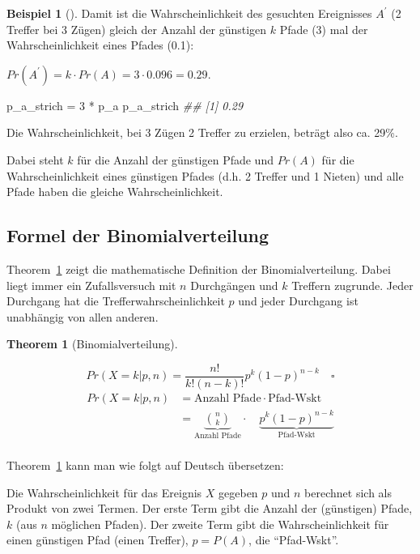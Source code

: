 \documentclass[
  ngerman,
  letterpaper,
  twoside,
  open=any]{scrbook}
\newenvironment{Shaded}{\begin{snugshade}}{\end{snugshade}}
\newcommand{\DecValTok}[1]{\textcolor[rgb]{0.68,0.00,0.00}{#1}}
\newcommand{\DocumentationTok}[1]{\textcolor[rgb]{0.37,0.37,0.37}{\textit{#1}}}
\newcommand{\NormalTok}[1]{\textcolor[rgb]{0.00,0.23,0.31}{#1}}
\newcommand{\OtherTok}[1]{\textcolor[rgb]{0.00,0.23,0.31}{#1}}
\newcommand{\SpecialCharTok}[1]{\textcolor[rgb]{0.37,0.37,0.37}{#1}}
\theoremstyle{definition}
\newtheorem{example}{Beispiel}[chapter]
\theoremstyle{plain}
\newtheorem{theorem}{Theorem}[chapter]
\theoremstyle{definition}
\theoremstyle{definition}
\theoremstyle{remark}
\begin{document}
\begin{example}[]
Damit ist die Wahrscheinlichkeit des gesuchten Ereignisses
\(A^{\prime}\) (2 Treffer bei 3 Zügen) gleich der Anzahl der günstigen
\(k\) Pfade (3) mal der Wahrscheinlichkeit eines Pfades (0.1):

\(Pr(A^{\prime}) = k \cdot Pr(A) = 3 \cdot 0.096 = 0.29\).

\begin{Shaded}
\begin{Highlighting}[]
\NormalTok{p\_a\_strich }\OtherTok{=} \DecValTok{3} \SpecialCharTok{*}\NormalTok{ p\_a}
\NormalTok{p\_a\_strich}
\DocumentationTok{\#\# [1] 0.29}
\end{Highlighting}
\end{Shaded}

Die Wahrscheinlichkeit, bei 3 Zügen 2 Treffer zu erzielen, beträgt also
ca. 29\%.

Dabei steht \(k\) für die Anzahl der günstigen Pfade und \(Pr(A)\) für
die Wahrscheinlichkeit eines günstigen Pfades (d.h. 2 Treffer und 1
Nieten) und alle Pfade haben die gleiche Wahrscheinlichkeit.

\subsection{Formel der
Binomialverteilung}\label{formel-der-binomialverteilung}

Theorem~\ref{thm-binomial} zeigt die mathematische Definition der
Binomialverteilung. Dabei liegt immer ein Zufallsversuch mit \(n\)
Durchgängen und \(k\) Treffern zugrunde. Jeder Durchgang hat die
Trefferwahrscheinlichkeit \(p\) und jeder Durchgang ist unabhängig von
allen anderen.

\begin{theorem}[Binomialverteilung]\protect\hypertarget{thm-binomial}{}\label{thm-binomial}

\[Pr(X=k|p,n) = \frac{n!}{k!(n-k)!}p^k(1-p)^{n-k}\quad \square\]
\[\begin{aligned}
Pr(X=k|p,n) &= \text{Anzahl Pfade} \cdot \text{Pfad-Wskt} \\
&= \underbrace{\binom{n}{k} }_{\text{Anzahl Pfade}} \cdot \quad \underbrace{p^k(1-p)^{n-k}}_{\text{Pfad-Wskt}} \\
\end{aligned}\]

\end{theorem}

Theorem~\ref{thm-binomial} kann man wie folgt auf Deutsch übersetzen:

\begin{displayquote}
Die Wahrscheinlichkeit für das Ereignis \(X\) gegeben \(p\) und \(n\)
berechnet sich als Produkt von zwei Termen. Der erste Term gibt die
Anzahl der (günstigen) Pfade, \(k\) (aus \(n\) möglichen Pfaden). Der
zweite Term gibt die Wahrscheinlichkeit für einen günstigen Pfad (einen
Treffer), \(p=P(A)\), die \enquote{Pfad-Wskt}.
\end{displayquote}


\end{example}
\end{document}
